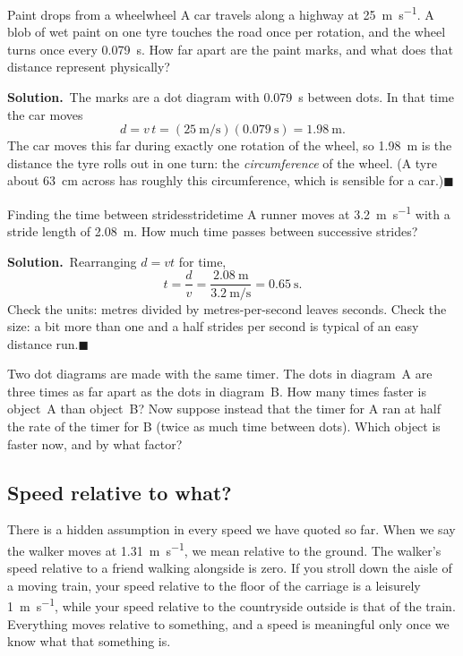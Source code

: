 \documentclass[11pt,twoside,openany]{book}
\newcounter{check}[chapter]
\newcommand{\solution}{\par\smallskip\noindent\textbf{Solution.}\ }
\newcommand{\qed}{\hfill$\blacksquare$}
\begin{document}
\begin{example}{Paint drops from a wheel}{wheel}
A car travels along a highway at \SI{25}{\metre\per\second}. A blob of wet paint on one tyre touches the road once per rotation, and the wheel turns once every \SI{0.079}{\second}. How far apart are the paint marks, and what does that distance represent physically?

\solution The marks are a dot diagram with \SI{0.079}{\second} between dots. In that time the car moves
\[
d = v\,t = (\SI{25}{\metre\per\second})(\SI{0.079}{\second}) = \SI{1.98}{\metre}.
\]
The car moves this far during exactly one rotation of the wheel, so \SI{1.98}{\metre} is the distance the tyre rolls out in one turn: the \emph{circumference} of the wheel. (A tyre about \SI{63}{\centi\metre} across has roughly this circumference, which is sensible for a car.)\qed
\end{example}

\begin{example}{Finding the time between strides}{stridetime}
A runner moves at \SI{3.2}{\metre\per\second} with a stride length of \SI{2.08}{\metre}. How much time passes between successive strides?

\solution Rearranging $d = vt$ for time,
\[
t = \frac{d}{v} = \frac{\SI{2.08}{\metre}}{\SI{3.2}{\metre\per\second}} = \SI{0.65}{\second}.
\]
Check the units: metres divided by metres-per-second leaves seconds. Check the size: a bit more than one and a half strides per second is typical of an easy distance run.\qed
\end{example}

\begin{checkbox}
Two dot diagrams are made with the same timer. The dots in diagram~A are three times as far apart as the dots in diagram~B. How many times faster is object~A than object~B? Now suppose instead that the timer for A ran at half the rate of the timer for B (twice as much time between dots). Which object is faster now, and by what factor?
\end{checkbox}

\subsection{Speed relative to what?}

There is a hidden assumption in every speed we have quoted so far. When we say the walker moves at \SI{1.31}{\metre\per\second}, we mean relative to the ground. The walker's speed relative to a friend walking alongside is zero. If you stroll down the aisle of a moving train, your speed relative to the floor of the carriage is a leisurely \SI{1}{\metre\per\second}, while your speed relative to the countryside outside is that of the train. Everything moves relative to something, and a speed is meaningful only once we know what that something is.
\end{document}
